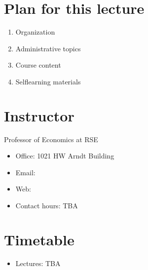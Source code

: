 \documentclass[letterpaper,10pt,english]{jupyterBook}
\begin{document}
\section{Plan for this lecture}
\label{\detokenize{00.intro:plan-for-this-lecture}}\begin{enumerate}
%
\item {} 
\sphinxAtStartPar
Organization

\item {} 
\sphinxAtStartPar
Administrative topics

\item {} 
\sphinxAtStartPar
Course content

\item {} 
\sphinxAtStartPar
Self\sphinxhyphen{}learning materials

\end{enumerate}


\section{Instructor}
\label{\detokenize{00.intro:instructor}}
\sphinxAtStartPar
{}
Professor of Economics at RSE
\begin{itemize}
\item {} 
\sphinxAtStartPar
Office: 1021 HW Arndt Building

\item {} 
\sphinxAtStartPar
Email: 

\item {} 
\sphinxAtStartPar
Web: 

\item {} 
\sphinxAtStartPar
Contact hours: TBA

\end{itemize}


\section{Timetable}
\label{\detokenize{00.intro:timetable}}
\sphinxAtStartPar
{}
\begin{itemize}
\item {} 
\sphinxAtStartPar
Lectures: TBA

\end{itemize}
\end{document}
